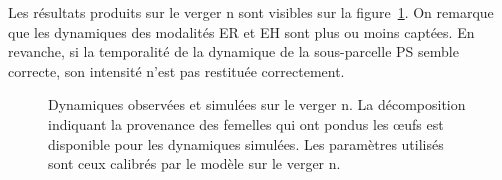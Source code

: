 Les résultats produits sur le verger n sont visibles sur la figure~\ref{fig:D2}.
On remarque que les dynamiques des modalités ER et EH sont plus ou moins captées.
En revanche, si la temporalité de la dynamique de la sous-parcelle PS semble correcte, son intensité n'est pas restituée correctement.
\begin{figure}[ht]
 \centering
 \caption{Dynamiques observées et simulées sur le verger n. La décomposition indiquant la provenance des femelles qui ont pondus les œufs est disponible pour les dynamiques simulées.
 Les paramètres utilisés sont ceux calibrés par le modèle sur le verger n.}
 \label{fig:D2}
\end{figure}











